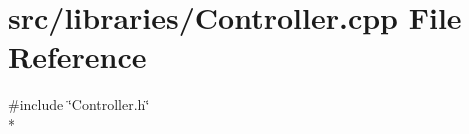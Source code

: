 \section{src/libraries/\-Controller.cpp File Reference}
\label{_controller_8cpp}
{\ttfamily \#include \char`\"{}Controller.\-h\char`\"{}}\\*
